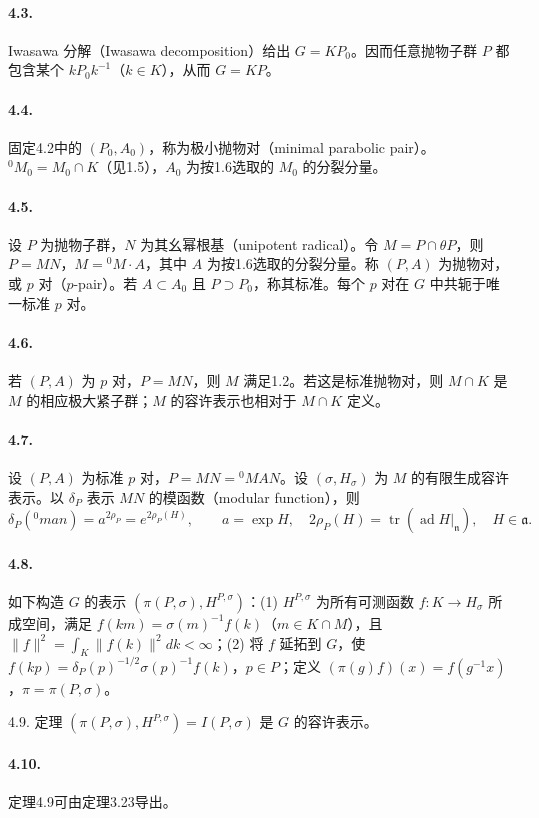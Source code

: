 \paragraph*{4.3.} Iwasawa 分解（Iwasawa decomposition）给出 $G=KP_0$。因而任意抛物子群 $P$ 都包含某个 $kP_0k^{-1}$（$k\in K$），从而 $G=KP$。
\paragraph*{4.4.} 固定4.2中的 $(P_0,A_0)$，称为极小抛物对（minimal parabolic pair）。${}^0M_0=M_0\cap K$（见1.5），$A_0$ 为按1.6选取的 $M_0$ 的分裂分量。
\paragraph*{4.5.} 设 $P$ 为抛物子群，$N$ 为其幺幂根基（unipotent radical）。令 $M=P\cap\theta P$，则 $P=MN$，$M={}^0M\cdot A$，其中 $A$ 为按1.6选取的分裂分量。称 $(P,A)$ 为抛物对，或 $p$ 对（$p$-pair）。若 $A\subset A_0$ 且 $P\supset P_0$，称其标准。每个 $p$ 对在 $G$ 中共轭于唯一标准 $p$ 对。
\paragraph*{4.6.} 若 $(P,A)$ 为 $p$ 对，$P=MN$，则 $M$ 满足1.2。若这是标准抛物对，则 $M\cap K$ 是 $M$ 的相应极大紧子群；$M$ 的容许表示也相对于 $M\cap K$ 定义。
\paragraph*{4.7.} 设 $(P,A)$ 为标准 $p$ 对，$P=MN={}^0MAN$。设 $(\sigma,H_\sigma)$ 为 $M$ 的有限生成容许表示。以 $\delta_P$ 表示 $MN$ 的模函数（modular function），则
\[
 \delta_P({}^0man)=a^{2\rho_P}=e^{2\rho_P(H)},\qquad
 a=\exp H,\quad 2\rho_P(H)=\operatorname{tr}(\operatorname{ad}H|_{\mathfrak n}),\quad H\in\mathfrak a.
\]
\paragraph*{4.8.} 如下构造 $G$ 的表示 $(\pi(P,\sigma),H^{P,\sigma})$：(1) $H^{P,\sigma}$ 为所有可测函数 $f:K\to H_\sigma$ 所成空间，满足 $f(km)=\sigma(m)^{-1}f(k)$（$m\in K\cap M$），且 $\|f\|^2=\int_K\|f(k)\|^2dk<\infty$；(2) 将 $f$ 延拓到 $G$，使 $f(kp)=\delta_P(p)^{-1/2}\sigma(p)^{-1}f(k)$，$p\in P$；定义 $(\pi(g)f)(x)=f(g^{-1}x)$，$\pi=\pi(P,\sigma)$。
\begin{originaltheorem}{4.9. 定理}
$(\pi(P,\sigma),H^{P,\sigma})=I(P,\sigma)$ 是 $G$ 的容许表示。
\end{originaltheorem}
\paragraph*{4.10.} 定理4.9可由定理3.23导出。
